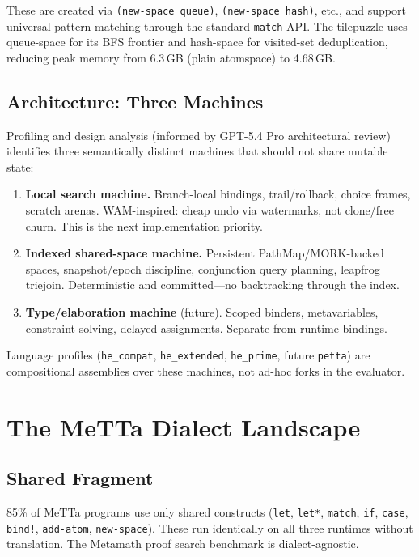 \documentclass[11pt]{article}
\newcommand{\code}[1]{\texttt{#1}}
\begin{document}
These are created via \code{(new-space queue)}, \code{(new-space hash)},
etc., and support universal pattern matching through the standard
\code{match} API\@.  The tilepuzzle uses queue-space for its BFS
frontier and hash-space for visited-set deduplication, reducing
peak memory from 6.3\,GB (plain atomspace) to 4.68\,GB.

\subsection{Architecture: Three Machines}

Profiling and design analysis (informed by GPT-5.4 Pro architectural
review) identifies three semantically distinct machines that should
not share mutable state:

\begin{enumerate}
\item \textbf{Local search machine.}
  Branch-local bindings, trail/rollback, choice frames, scratch arenas.
  WAM-inspired: cheap undo via watermarks, not clone/free churn.
  This is the next implementation priority.

\item \textbf{Indexed shared-space machine.}
  Persistent PathMap/MORK-backed spaces, snapshot/epoch discipline,
  conjunction query planning, leapfrog triejoin.
  Deterministic and committed---no backtracking through the index.

\item \textbf{Type/elaboration machine} (future).
  Scoped binders, metavariables, constraint solving, delayed
  assignments.  Separate from runtime bindings.
\end{enumerate}

Language profiles (\code{he\_compat}, \code{he\_extended},
\code{he\_prime}, future \code{petta}) are compositional assemblies
over these machines, not ad-hoc forks in the evaluator.

\section{The MeTTa Dialect Landscape}

\subsection{Shared Fragment}

85\% of MeTTa programs use only shared constructs (\code{let},
\code{let*}, \code{match}, \code{if}, \code{case}, \code{bind!},
\code{add-atom}, \code{new-space}).  These run identically on all three
runtimes without translation.  The Metamath proof search benchmark is
dialect-agnostic.
\end{document}
